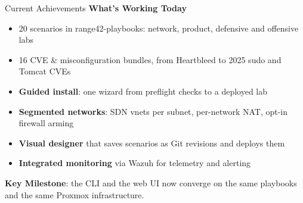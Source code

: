 \documentclass[aspectratio=169]{beamer}
\begin{document}
\begin{frame}[shrink=12]{Current Achievements \; \faCheckCircle}
  \color{cyber-ink}
  \textbf{What's Working Today}
  \begin{itemize}
    \item \alert{20 scenarios} in range42-playbooks: network, product, defensive and offensive labs
    \item \alert{16 CVE \& misconfiguration bundles}, from Heartbleed to 2025 sudo and Tomcat CVEs
    \item \textbf{Guided install}: one wizard from preflight checks to a deployed lab
    \item \textbf{Segmented networks}: SDN vnets per subnet, per-network NAT, opt-in firewall arming
    \item \textbf{Visual designer} that saves scenarios as Git revisions and deploys them
    \item \textbf{Integrated monitoring} via Wazuh for telemetry and alerting
  \end{itemize}
  \vspace{2mm}
  \begin{tcolorbox}
    \faLightbulb\; \textbf{Key Milestone}: the CLI and the web UI now converge on the same playbooks and the same Proxmox infrastructure.
  \end{tcolorbox}
\end{frame}
\end{document}

